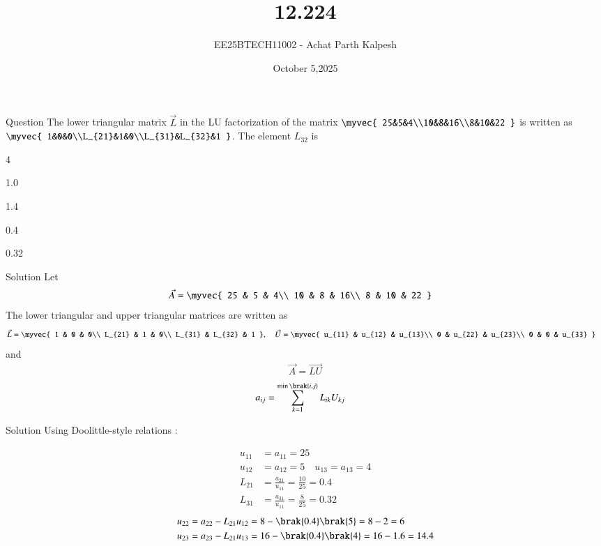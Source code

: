 \documentclass{beamer}
\title %
{12.224}
\date{October 5,2025}
\author %
{EE25BTECH11002 - Achat Parth Kalpesh}
\begin{document}
\frame{\titlepage}

\begin{frame}{Question}
The lower triangular matrix $\vec{L}$ in the LU factorization of the matrix
$\myvec{
    25&5&4\\10&8&16\\8&10&22
}$ is written as $\myvec{
    1&0&0\\L_{21}&1&0\\L_{31}&L_{32}&1
}$. The element $L_{32}$ is 
\begin{enumerate}
\begin{multicols}{4}
\item 1.0 
\item 1.4 
\item 0.4 
\item 0.32
\end{multicols}
\end{enumerate}
\end{frame}

\begin{frame}{Solution}
Let 
\begin{align}
    \vec{A} &= \myvec{
        25 & 5 & 4\\
        10 & 8 & 16\\
        8 & 10 & 22
    }
\end{align}
The lower triangular and upper triangular matrices are written as
\begin{align}
    \vec{L} &= \myvec{
        1 & 0 & 0\\
        L_{21} & 1 & 0\\
        L_{31} & L_{32} & 1
    }, \quad
    \vec{U} = \myvec{
        u_{11} & u_{12} & u_{13}\\
        0 & u_{22} & u_{23}\\
        0 & 0 & u_{33}
    }
\end{align}
and
\begin{align}
    \vec{A} = \vec{LU}
\end{align}
\begin{align}
    a_{ij} &= \sum_{k=1}^{\min\brak{i,j}} L_{ik}U_{kj}
\end{align}
\end{frame}



\begin{frame}{Solution}
Using Doolittle-style relations :

\begin{align}
u_{11} &= a_{11} = 25\\
u_{12} &= a_{12} = 5\quad u_{13}=a_{13}=4\\
L_{21} &= \frac{a_{21}}{u_{11}}=\frac{10}{25}=0.4\\
L_{31} &= \frac{a_{31}}{u_{11}}=\frac{8}{25}=0.32
\end{align}
\begin{align}
u_{22} &= a_{22} - L_{21}u_{12} = 8 - \brak{0.4}\brak{5} = 8 - 2 = 6\\
u_{23} &= a_{23} - L_{21}u_{13} = 16 - \brak{0.4}\brak{4} = 16 - 1.6 = 14.4
\end{align}
\end{frame}
\end{document}
